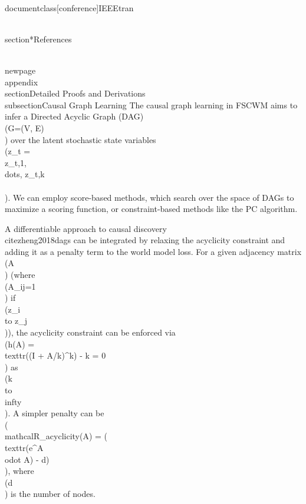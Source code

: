 \\documentclass[conference]{IEEEtran}
\begin{document}
\\section*{References}
\
\

\\newpage
\\appendix
\\section{Detailed Proofs and Derivations}
\\subsection{Causal Graph Learning}
The causal graph learning in FSCWM aims to infer a Directed Acyclic Graph (DAG) \\(G=(V, E)\\) over the latent stochastic state variables \\(z_t = \\{z_{t,1}, \\dots, z_{t,k}\\}\\). We can employ score-based methods, which search over the space of DAGs to maximize a scoring function, or constraint-based methods like the PC algorithm.

A differentiable approach to causal discovery \\cite{zheng2018dags} can be integrated by relaxing the acyclicity constraint and adding it as a penalty term to the world model loss. For a given adjacency matrix \\(A\\) (where \\(A_{ij}=1\\) if \\(z_i \\to z_j\\)), the acyclicity constraint can be enforced via \\(h(A) = \\text{tr}((I + A/k)^k) - k = 0\\) as \\(k \\to \\infty\\). A simpler penalty can be \\(\\mathcal{R}_{acyclicity}(A) = (\\text{tr}(e^{A \\odot A}) - d)\\), where \\(d\\) is the number of nodes.
\end{document}
